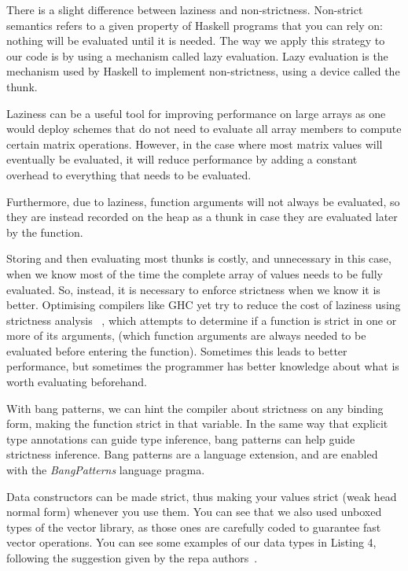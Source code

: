 \documentclass{tmr}
\begin{document}
There is a slight difference between laziness and non-strictness. Non-strict
semantics refers to a given property of Haskell programs that you can rely on: 
nothing will be evaluated until it is needed. The way we apply this strategy to 
our code is by using a mechanism called lazy evaluation. Lazy evaluation is the 
mechanism used by Haskell to implement non-strictness, using a device called the thunk. 

Laziness can be a useful tool for improving performance on large arrays as one would deploy
schemes that do not need to evaluate all array members to compute certain matrix operations.
However, in the case where most matrix values will eventually be evaluated, it will 
reduce performance by adding a constant overhead to everything that needs to be evaluated.

Furthermore, due to laziness, function arguments will not always be
evaluated, so they are instead recorded on the heap as a thunk in case
they are evaluated later by the function. 

Storing and then evaluating most thunks is costly, and unnecessary in this case, when we know 
most of the time the complete array of values needs to be fully evaluated. So, instead,
it is necessary to enforce strictness when we know it is better.
Optimising compilers like GHC yet try to reduce the cost of laziness using strictness analysis
 ~\cite{Strictness}, which attempts to determine if a function is strict in one or more of 
its arguments, (which function arguments are always needed to be evaluated before entering the function). 
Sometimes this leads to better performance, but sometimes the programmer has better knowledge about what
is worth evaluating beforehand.

With bang patterns, we can hint the compiler about strictness on any binding form, 
making the function strict in that variable. In the same way that explicit type annotations can 
guide type inference, bang patterns can help guide strictness inference. Bang patterns 
are a language extension, and are enabled with the \textit{BangPatterns} language pragma.

Data constructors can be made strict, thus making your values strict (weak head normal form)
whenever you use them.  You can see that we also used unboxed types of the vector library,
as those ones are carefully coded to guarantee fast vector operations. You can see some examples of 
our data types in Listing 4, following the suggestion given by the repa authors~\cite{bang}.
\end{document}
